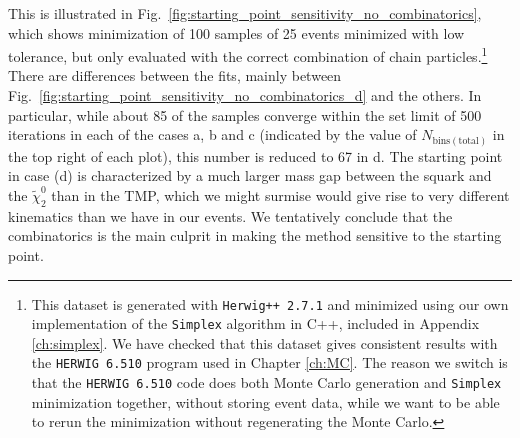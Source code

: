 \documentclass[twoside,english]{uiofysmaster}
\begin{document}
This is illustrated in Fig.\ \ref{fig:starting_point_sensitivity_no_combinatorics}, which shows minimization of 100 samples of 25 events minimized with low tolerance, but only evaluated with the correct combination of chain particles.\footnote{This dataset is generated with {\tt Herwig++ 2.7.1} \cite{Bahr:2008pv} and minimized using our own implementation of the {\tt Simplex} algorithm in C++, included in Appendix \ref{ch:simplex}. 
We have checked that this dataset gives consistent results with the {\tt HERWIG 6.510} program used in Chapter \ref{ch:MC}. The reason we switch is that the {\tt HERWIG 6.510} code \cite{Webber:epost} does both Monte Carlo generation and {\tt Simplex} minimization together, without storing event data, while we want to be able to rerun the minimization without regenerating the Monte Carlo.} There are differences between the fits, mainly between Fig.\ \ref{fig:starting_point_sensitivity_no_combinatorics_d} and the others. In particular, while about 85 of the samples converge within the set limit of 500 iterations in each of the cases a, b and c (indicated by the value of $N_\mathrm{bins(total)}$ in the top right of each plot), this number is reduced to 67 in d. The starting point in case (d) is characterized by a much larger mass gap between the squark and the $\tilde\chi_2^0$ than in the TMP, which we might surmise would give rise to very different kinematics than we have in our events. We tentatively conclude that the combinatorics is the main culprit in making the method sensitive to the starting point.
\end{document}

